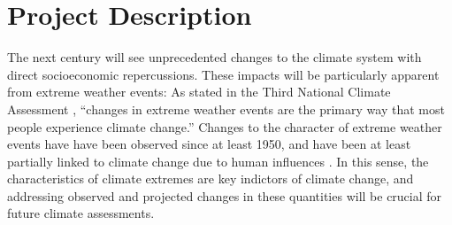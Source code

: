\documentclass[11pt]{article}
\begin{document}
\appendix

\addtocounter{section}{3}

 
\section{Project Description}

The next century will see unprecedented changes to the climate system with direct socioeconomic repercussions.  These impacts will be particularly apparent from extreme weather events: As stated in the Third National Climate Assessment \citep{ThirdNCA}, ``changes in extreme weather events are the primary way that most people experience climate change.''  Changes to the character of extreme weather events have have been observed since at least 1950, and have been at least partially linked to climate change due to human influences \citep{IPCCAR5WGI}.  In this sense, the characteristics of climate extremes are key indictors of climate change, and addressing observed and projected changes in these quantities will be crucial for future climate assessments.
\end{document}
